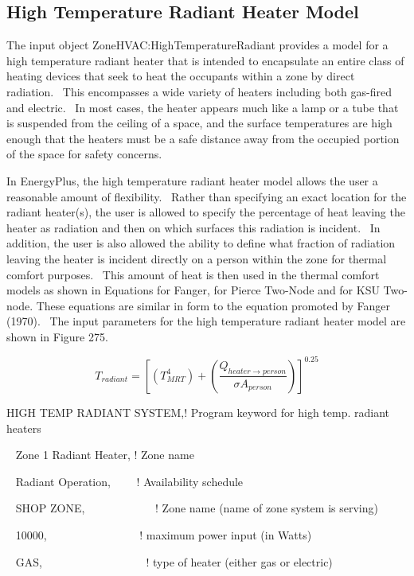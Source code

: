 \subsection{High Temperature Radiant Heater Model}\label{high-temperature-radiant-heater-model}

The input object ZoneHVAC:HighTemperatureRadiant provides a model for a high temperature radiant heater that is intended to encapsulate an entire class of heating devices that seek to heat the occupants within a zone by direct radiation.~ This encompasses a wide variety of heaters including both gas-fired and electric.~ In most cases, the heater appears much like a lamp or a tube that is suspended from the ceiling of a space, and the surface temperatures are high enough that the heaters must be a safe distance away from the occupied portion of the space for safety concerns.

In EnergyPlus, the high temperature radiant heater model allows the user a reasonable amount of flexibility.~ Rather than specifying an exact location for the radiant heater(s), the user is allowed to specify the percentage of heat leaving the heater as radiation and then on which surfaces this radiation is incident.~ In addition, the user is also allowed the ability to define what fraction of radiation leaving the heater is incident directly on a person within the zone for thermal comfort purposes.~ This amount of heat is then used in the thermal comfort models as shown in Equations for Fanger, for Pierce Two-Node and for KSU Two-node. These equations are similar in form to the equation promoted by Fanger (1970).~ The input parameters for the high temperature radiant heater model are shown in Figure 275.

\begin{equation}
{T_{radiant}} = {\left[ {\left( {T_{MRT}^4} \right) + \left( {\frac{{{Q_{heater \to person}}}}{{\sigma {A_{person}}}}} \right)} \right]^{0.25}}
\end{equation}

HIGH TEMP RADIANT SYSTEM,! Program keyword for high temp. radiant heaters

~ Zone 1 Radiant Heater, ! Zone name

~ Radiant Operation,~~~~ ! Availability schedule

~ SHOP ZONE,~~~~~~~~~~~~ ! Zone name (name of zone system is serving)

~ 10000,~~~~~~~~~~~~~~~~ ! maximum power input (in Watts)

~ GAS,~~~~~~~~~~~~~~~~~~ ! type of heater (either gas or electric)

